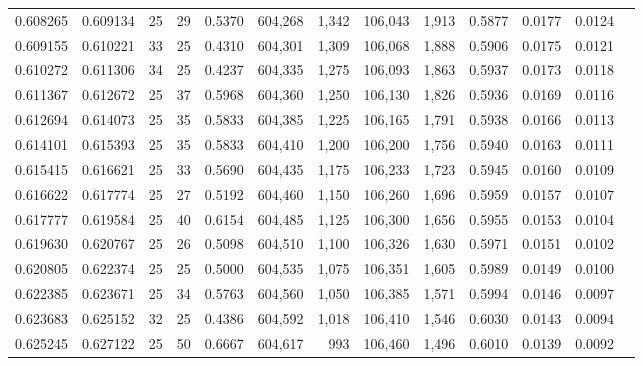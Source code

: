 \begin{tabular}{rrrrrrrrrrrrr}
0.608265 & 0.609134 &    25 &  29 &                                     0.5370 & 604,268 &   1,342 & 106,043 &   1,913 & 0.5877 & 0.0177 & 0.0124 \\
0.609155 & 0.610221 &    33 &  25 &                                     0.4310 & 604,301 &   1,309 & 106,068 &   1,888 & 0.5906 & 0.0175 & 0.0121 \\
0.610272 & 0.611306 &    34 &  25 &                                     0.4237 & 604,335 &   1,275 & 106,093 &   1,863 & 0.5937 & 0.0173 & 0.0118 \\
0.611367 & 0.612672 &    25 &  37 &                                     0.5968 & 604,360 &   1,250 & 106,130 &   1,826 & 0.5936 & 0.0169 & 0.0116 \\
0.612694 & 0.614073 &    25 &  35 &                                     0.5833 & 604,385 &   1,225 & 106,165 &   1,791 & 0.5938 & 0.0166 & 0.0113 \\
0.614101 & 0.615393 &    25 &  35 &                                     0.5833 & 604,410 &   1,200 & 106,200 &   1,756 & 0.5940 & 0.0163 & 0.0111 \\
0.615415 & 0.616621 &    25 &  33 &                                     0.5690 & 604,435 &   1,175 & 106,233 &   1,723 & 0.5945 & 0.0160 & 0.0109 \\
0.616622 & 0.617774 &    25 &  27 &                                     0.5192 & 604,460 &   1,150 & 106,260 &   1,696 & 0.5959 & 0.0157 & 0.0107 \\
0.617777 & 0.619584 &    25 &  40 &                                     0.6154 & 604,485 &   1,125 & 106,300 &   1,656 & 0.5955 & 0.0153 & 0.0104 \\
0.619630 & 0.620767 &    25 &  26 &                                     0.5098 & 604,510 &   1,100 & 106,326 &   1,630 & 0.5971 & 0.0151 & 0.0102 \\
0.620805 & 0.622374 &    25 &  25 &                                     0.5000 & 604,535 &   1,075 & 106,351 &   1,605 & 0.5989 & 0.0149 & 0.0100 \\
0.622385 & 0.623671 &    25 &  34 &                                     0.5763 & 604,560 &   1,050 & 106,385 &   1,571 & 0.5994 & 0.0146 & 0.0097 \\
0.623683 & 0.625152 &    32 &  25 &                                     0.4386 & 604,592 &   1,018 & 106,410 &   1,546 & 0.6030 & 0.0143 & 0.0094 \\
0.625245 & 0.627122 &    25 &  50 &                                     0.6667 & 604,617 &     993 & 106,460 &   1,496 & 0.6010 & 0.0139 & 0.0092 \\

\end{tabular}
